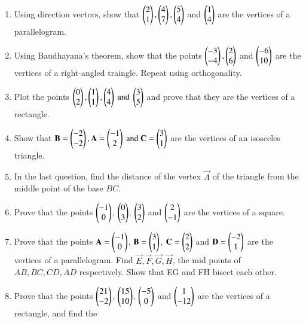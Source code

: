 \begin{enumerate}[label=\arabic*.,ref=\thesubsection.\theenumi]
\item Using direction vectors, show that  $\begin{pmatrix}2\\1\end{pmatrix}, \begin{pmatrix}4\\7\end{pmatrix}, \begin{pmatrix}5\\4\end{pmatrix}$ and $\begin{pmatrix}1\\4\end{pmatrix}$ are the vertices of a parallelogram.
\item Using Baudhayana's theorem, show that the points $\begin{pmatrix}-3\\-4\end{pmatrix}, \begin{pmatrix}2\\6\end{pmatrix}$ and $\begin{pmatrix}-6\\10\end{pmatrix}$  are the vertices of a right-angled
traingle.  Repeat using orthogonality.
\item Plot the points $\begin{pmatrix}0\\2\end{pmatrix},\begin{pmatrix}1\\1\end{pmatrix},\begin{pmatrix}4\\4\end{pmatrix}\text{ and }\begin{pmatrix}3\\5\end{pmatrix}$ and prove that they are the vertices of a rectangle.
\item Show that $\mathbf{B}=\begin{pmatrix}-2\\-2\end{pmatrix},\mathbf{A}=\begin{pmatrix}-1\\2\end{pmatrix}\text{ and }\mathbf{C}=\begin{pmatrix}3\\1\end{pmatrix}$ are the vertices of an isosceles triangle.
\item In the last question, find the distance of the vertex $\vec{A}$ of the triangle from the middle point of the base $BC$.
\item Prove that the points $\begin{pmatrix}-1\\0\end{pmatrix}$, $\begin{pmatrix}0\\3\end{pmatrix}$, $\begin{pmatrix}3\\2\end{pmatrix}$ and $\begin{pmatrix}2\\-1\end{pmatrix}$ are the vertices of a square.
\item Prove that the points $\mathbf{A}=\begin{pmatrix}-1\\0\end{pmatrix}$, $\mathbf{B}=\begin{pmatrix}3\\1\end{pmatrix}$, $\mathbf{C}=\begin{pmatrix}2\\2\end{pmatrix}$  and $\mathbf{D}=\begin{pmatrix}-2\\1\end{pmatrix}$ are the vertices of a parallelogram.  Find $\vec{E},\vec{F},\vec{G},\vec{H}$, the mid points of $AB, BC, CD, AD$ respectively.  Show that EG and FH bisect each other.
\item Prove that the points $\begin{pmatrix}21\\-2\end{pmatrix}$, $\begin{pmatrix}15\\10\end{pmatrix}$, $\begin{pmatrix}-5\\0\end{pmatrix}$  and $\begin{pmatrix}1\\-12\end{pmatrix}$ are the vertices of a rectangle, and find the

\end{enumerate}
